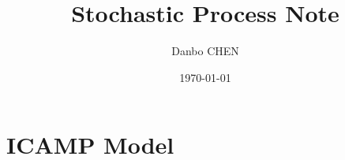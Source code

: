 \documentclass{article}
\title{Stochastic Process Note}
\author{Danbo CHEN}
\date{\today}
\begin{document}
\maketitle
\vspace{.25in}
\tableofcontents

\section{ICAMP Model}
\end{document}
